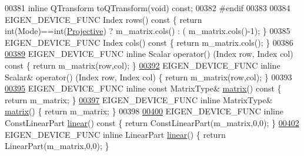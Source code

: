 \begin{DoxyCode}
00381   \textcolor{keyword}{inline} QTransform toQTransform(\textcolor{keywordtype}{void}) \textcolor{keyword}{const};
00382 \textcolor{preprocessor}{  #endif}
00383   
00384   EIGEN\_DEVICE\_FUNC Index rows()\textcolor{keyword}{ const }\{ \textcolor{keywordflow}{return} int(Mode)==int(\hyperlink{group__enums_ggaee59a86102f150923b0cac6d4ff05107aead6a2de12a17aaa4f5c523215dfccad}{Projective}) ? m\_matrix.cols() : (
      m\_matrix.cols()-1); \}
00385   EIGEN\_DEVICE\_FUNC Index cols()\textcolor{keyword}{ const }\{ \textcolor{keywordflow}{return} m\_matrix.cols(); \}
00386 
\hyperlink{group___geometry___module_aa0a930a85c51566fe06d281da85d1a4a}{00389}   EIGEN\_DEVICE\_FUNC \textcolor{keyword}{inline} Scalar operator() (Index row, Index col)\textcolor{keyword}{ const }\{ \textcolor{keywordflow}{return} m\_matrix(row,col); \}
\hyperlink{group___geometry___module_ab66b426ef3ebf955d4f925cbcee34293}{00392}   EIGEN\_DEVICE\_FUNC \textcolor{keyword}{inline} Scalar& operator() (Index row, Index col) \{ \textcolor{keywordflow}{return} m\_matrix(row,col); \}
00393 
\hyperlink{group___geometry___module_aec8168000a88a807130d41020af98d47}{00395}   EIGEN\_DEVICE\_FUNC \textcolor{keyword}{inline} \textcolor{keyword}{const} MatrixType& \hyperlink{group___geometry___module_aec8168000a88a807130d41020af98d47}{matrix}()\textcolor{keyword}{ const }\{ \textcolor{keywordflow}{return} m\_matrix; \}
\hyperlink{group___geometry___module_aee6c4863933d3660e56e3333e0506cc2}{00397}   EIGEN\_DEVICE\_FUNC \textcolor{keyword}{inline} MatrixType& \hyperlink{group___geometry___module_aee6c4863933d3660e56e3333e0506cc2}{matrix}() \{ \textcolor{keywordflow}{return} m\_matrix; \}
00398 
\hyperlink{group___geometry___module_a535bd63d047c2a36585c3f9b62219a1e}{00400}   EIGEN\_DEVICE\_FUNC \textcolor{keyword}{inline} ConstLinearPart \hyperlink{group___geometry___module_a535bd63d047c2a36585c3f9b62219a1e}{linear}()\textcolor{keyword}{ const }\{ \textcolor{keywordflow}{return} ConstLinearPart(m\_matrix,0,0); \}
\hyperlink{group___geometry___module_a540cef80cd714fa01d124536d39ac8da}{00402}   EIGEN\_DEVICE\_FUNC \textcolor{keyword}{inline} LinearPart \hyperlink{group___geometry___module_a540cef80cd714fa01d124536d39ac8da}{linear}() \{ \textcolor{keywordflow}{return} LinearPart(m\_matrix,0,0); \}

\end{DoxyCode}
